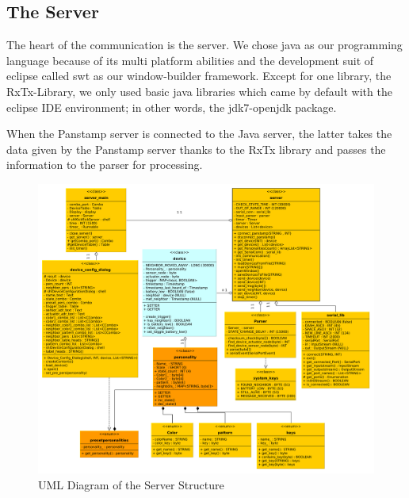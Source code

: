 \subsection{The Server}
The heart of the communication is the server. We chose java\cite{java} as our programming language because of its multi platform abilities and the development suit of eclipse\cite{eclipse} called swt\cite{swt} as our window-builder framework.%
Except for one library, the RxTx-Library\cite{rxtx}, we only used basic java libraries which came by default with the eclipse IDE\cite{ide} environment; in other words, the jdk7-openjdk\cite{open_jdk} package. %

When the Panstamp server is connected to the Java server, the latter takes the data given by the Panstamp server thanks to the RxTx library \cite{rxtx} and passes the information to the parser for processing. %


\begin{figure}[ht]
	\centerline{\includegraphics[width=\textwidth]{./graph/general.pdf}}
	\caption{UML Diagram of the Server Structure}
	\label{fig:server_uml}
\end{figure}


